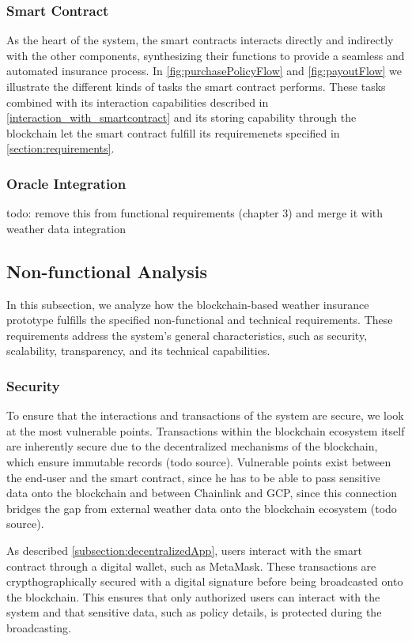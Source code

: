 \subsubsection{Smart Contract}
As the heart of the system, the smart contracts interacts directly and indirectly with the other components, synthesizing their functions to provide a seamless and automated insurance process. In \cref{fig:purchasePolicyFlow} and \cref{fig:payoutFlow} we illustrate the different kinds of tasks the smart contract performs. These tasks combined with its interaction capabilities described in \cref{interaction_with_smartcontract} and its storing capability through the blockchain let the smart contract fulfill its requiremenets specified in \cref{section:requirements}. 

\subsubsection{Oracle Integration}

todo: remove this from functional requirements (chapter 3) and merge it with weather data integration

\subsection{Non-functional Analysis}

In this subsection, we analyze how the blockchain-based weather insurance prototype fulfills the specified non-functional and technical requirements. These requirements address the system's general characteristics, such as security, scalability, transparency, and its technical capabilities.

\subsubsection{Security}

To ensure that the interactions and transactions of the system are secure, we look at the most vulnerable points. Transactions within the blockchain ecosystem itself are inherently secure due to the decentralized mechanisms of the blockchain, which ensure immutable records (todo source). Vulnerable points exist between the end-user and the smart contract, since he has to be able to pass sensitive data onto the blockchain and between Chainlink and GCP, since this connection bridges the gap from external weather data onto the blockchain ecosystem (todo source). 

As described \cref{subsection:decentralizedApp}, users interact with the smart contract through a digital wallet, such as MetaMask. These transactions are crypthographically secured with a digital signature before being broadcasted onto the blockchain. This ensures that only authorized users can interact with the system and that sensitive data, such as policy details, is protected during the broadcasting. 

